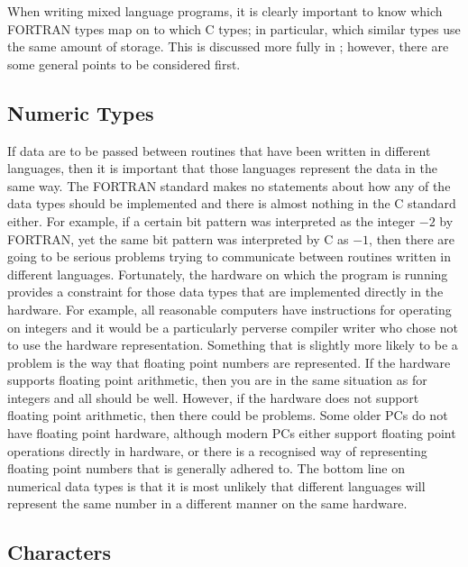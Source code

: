 \documentclass[twoside,11pt,nolof]{starlink}
\begin{document}
When writing mixed language programs, it is clearly important to know which
FORTRAN types map on to which C types; in particular, which similar types use
the same amount of storage. This is discussed more fully in
; however, there are some general
points to be considered first.

\subsection{Numeric Types}

If data are to be passed between routines that have been written in different
languages, then it is important that those languages represent the data in the
same way. The FORTRAN standard makes no statements about how any of the data
types should be implemented and there is almost nothing in the C standard
either. For example, if a certain bit pattern was interpreted as the integer
$-2$ by FORTRAN, yet the same bit pattern was interpreted by C as $-1$, then
there are going to be serious problems trying to communicate between routines
written in different languages. Fortunately, the hardware on which the program
is running provides a constraint for those data types that are implemented
directly in the  hardware. For example, all reasonable computers have
instructions for operating on integers and it would be a particularly perverse
compiler writer who chose not to use the hardware representation. Something
that is slightly more likely to be a problem is the way that floating point
numbers are represented. If the hardware supports floating point arithmetic,
then you are in the same situation as for integers and all should be well.
However, if the hardware does not support floating point arithmetic, then there
could be problems. Some older PCs do not have floating point hardware, although
modern PCs either support floating point operations directly in hardware, or
there is a recognised way of representing floating point numbers that is
generally adhered to. The bottom line on numerical data types is that it is
most unlikely that different languages will represent the same number in a
different manner on the same hardware.

\subsection{Characters}
\end{document}
